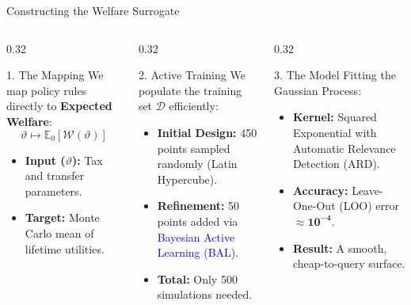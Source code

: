 \documentclass[10pt,aspectratio=169]{beamer}
\begin{document}
\begin{frame}{Constructing the Welfare Surrogate}
    \begin{columns}[t]
        \begin{column}{0.32\textwidth}
            \begin{block}{1. The Mapping}
                \small
                We map policy rules directly to \textbf{Expected Welfare}:
                \[
                    \vartheta \longmapsto \mathbb{E}_0[\mathcal{W}(\vartheta)]
                \]
                \begin{itemize}
                    \item \textbf{Input ($\vartheta$):} Tax and transfer parameters.
                    \item \textbf{Target:} Monte Carlo mean of lifetime utilities.
                \end{itemize}
            \end{block}
        \end{column}
        \begin{column}{0.32\textwidth}
            \begin{block}{2. Active Training}
                \small
                We populate the training set $\mathcal{D}$ efficiently:
                \begin{itemize}
                    \item \textbf{Initial Design:} 450 points sampled randomly (Latin Hypercube).
                    \item \textbf{Refinement:} 50 points added via \textcolor{blue}{Bayesian Active Learning (BAL)}.
                    \item \textbf{Total:} Only 500 simulations needed.
                \end{itemize}
            \end{block}
        \end{column}
        \begin{column}{0.32\textwidth}
            \begin{block}{3. The Model}
                \small
                Fitting the Gaussian Process:
                \begin{itemize}
                    \item \textbf{Kernel:} Squared Exponential with Automatic Relevance Detection (ARD).
                    \item \textbf{Accuracy:} Leave-One-Out (LOO) error $\approx \mathbf{10^{-4}}$.
                    \item \textbf{Result:} A smooth, cheap-to-query surface.
                \end{itemize}
            \end{block}
        \end{column}
    \end{columns}


\end{frame}
\end{document}
